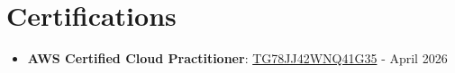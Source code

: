 \documentclass[letterpaper,]{article}
\newcommand{\resumeItem}[2]{
  \item\small{
    \textbf{#1}{: #2 \vspace{-2pt}}
  }
}
\newcommand{\resumeSubItem}[2]{\resumeItem{#1}{#2}\vspace{-4pt}}
\newcommand{\resumeSubHeadingListStart}{\begin{itemize}[leftmargin=*]}
\newcommand{\resumeSubHeadingListEnd}{\end{itemize}}
\begin{document}
\section{Certifications}

  \resumeSubHeadingListStart
    \resumeSubItem{AWS Certified Cloud Practitioner}
      {\href{https://cp.certmetrics.com/amazon/en/public/verify/credential/TG78JJ42WNQ41G35}{TG78JJ42WNQ41G35}} - {{April 2026}}
  \resumeSubHeadingListEnd







\end{document}
